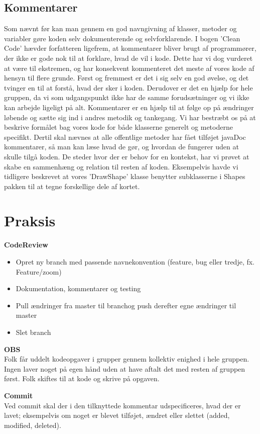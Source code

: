 \documentclass{article}
\begin{document}
\subsection{Kommentarer}
Som nævnt før kan man gennem en god navngivning af klasser, metoder og variabler gøre koden selv­ dokumenterende og selvforklarende. I bogen ’Clean Code’ hævder forfatteren ligefrem, at kommentarer bliver brugt af programmører, der ikke er gode nok til at forklare, hvad de vil i kode. Dette har vi dog vurderet at være til ekstremen, og har konsekvent kommenteret det meste af vores kode af hensyn til flere grunde. Først og fremmest er det i sig selv en god øvelse, og det tvinger en til at forstå, hvad der sker i koden. Derudover er det en hjælp for hele gruppen, da vi som udgangspunkt ikke har de samme forudsætninger og vi ikke kan arbejde ligeligt på alt. Kommentarer er en hjælp til at følge op på ændringer løbende og sætte sig ind i andres metodik og tankegang.
Vi har bestræbt os på at beskrive formålet bag vores kode for både klasserne generelt og metoderne specifikt. Dertil skal nævnes at alle offentlige metoder har fået tilføjet javaDoc kommentarer, så man kan læse hvad de gør, og hvordan de fungerer uden at skulle tilgå koden. De steder hvor der er behov for en kontekst, har vi prøvet at skabe en sammenhæng og relation til resten af koden. Eksempelvis havde vi tidligere beskrevet at vores ’DrawShape’ klasse benytter subklasserne i Shapes pakken til at tegne forskellige dele af kortet.

\section{Praksis}

\textbf{CodeReview}

\begin{itemize}
	\item Opret ny branch med passende navnekonvention (feature, bug eller tredje, fx. Feature/zoom)
	\item Dokumentation, kommentarer og testing
	\item Pull ændringer fra master til branchog push derefter egne ændringer til master 
	\item Slet branch
\end{itemize}

\textbf{OBS}
\\
Folk får uddelt kodeopgaver i grupper gennem kollektiv enighed i hele gruppen. Ingen laver noget på egen hånd uden at have aftalt det med resten af gruppen først. Folk skiftes til at kode og skrive på opgaven.

\textbf{Commit}
\\
Ved commit skal der i den tilknyttede kommentar udspecificeres, hvad der er lavet; eksempelvis om noget er blevet tilføjet, ændret eller slettet (added, modified, deleted).
\end{document}
